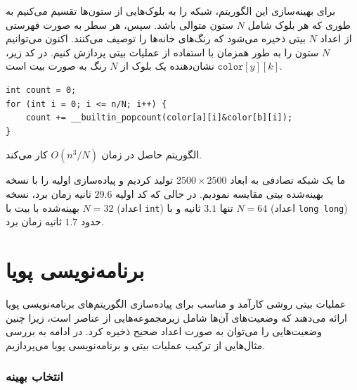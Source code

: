 برای بهینه‌سازی این الگوریتم، شبکه را به بلوک‌هایی
از ستون‌ها تقسیم می‌کنیم به طوری که هر بلوک شامل $N$
ستون متوالی باشد. سپس، هر سطر به صورت
فهرستی از اعداد $N$ بیتی ذخیره می‌شود که رنگ‌های
خانه‌ها را توصیف می‌کنند. اکنون می‌توانیم $N$ ستون را به طور همزمان
با استفاده از عملیات بیتی پردازش کنیم. در کد زیر،
$\texttt{color}[y][k]$ نشان‌دهنده
یک بلوک از $N$ رنگ به صورت بیت است.
\begin{lstlisting}
int count = 0;
for (int i = 0; i <= n/N; i++) {
    count += __builtin_popcount(color[a][i]&color[b][i]);
}
\end{lstlisting}
الگوریتم حاصل در زمان $O(n^3/N)$ کار می‌کند.

ما یک شبکه تصادفی به ابعاد $2500 \times 2500$ تولید کردیم
و پیاده‌سازی اولیه را با نسخه بهینه‌شده بیتی مقایسه نمودیم.
در حالی که کد اولیه $29.6$ ثانیه زمان برد،
نسخه بهینه‌شده با بیت با $N=32$ (اعداد \texttt{int}) تنها $3.1$ ثانیه
و با $N=64$ (اعداد \texttt{long long}) حدود $1.7$ ثانیه
زمان برد.

\section{برنامه‌نویسی پویا}

عملیات بیتی روشی کارآمد و مناسب برای
پیاده‌سازی الگوریتم‌های برنامه‌نویسی پویا ارائه می‌دهند
که وضعیت‌های آن‌ها شامل زیرمجموعه‌هایی از عناصر است،
زیرا چنین وضعیت‌هایی را می‌توان به صورت اعداد صحیح ذخیره کرد.
در ادامه به بررسی مثال‌هایی از ترکیب
عملیات بیتی و برنامه‌نویسی پویا می‌پردازیم.

\subsubsection{انتخاب بهینه}

